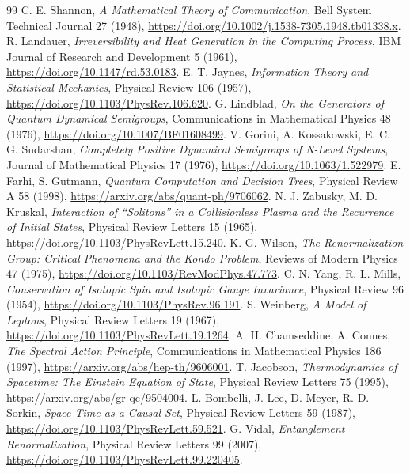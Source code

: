 \documentclass[11pt,a4paper]{article}
\begin{document}
\begin{thebibliography}{99}
 C. E. Shannon, \emph{A Mathematical Theory of Communication}, Bell System Technical Journal 27 (1948), \url{https://doi.org/10.1002/j.1538-7305.1948.tb01338.x}.
 R. Landauer, \emph{Irreversibility and Heat Generation in the Computing Process}, IBM Journal of Research and Development 5 (1961), \url{https://doi.org/10.1147/rd.53.0183}.
 E. T. Jaynes, \emph{Information Theory and Statistical Mechanics}, Physical Review 106 (1957), \url{https://doi.org/10.1103/PhysRev.106.620}.
 G. Lindblad, \emph{On the Generators of Quantum Dynamical Semigroups}, Communications in Mathematical Physics 48 (1976), \url{https://doi.org/10.1007/BF01608499}.
 V. Gorini, A. Kossakowski, E. C. G. Sudarshan, \emph{Completely Positive Dynamical Semigroups of N-Level Systems}, Journal of Mathematical Physics 17 (1976), \url{https://doi.org/10.1063/1.522979}.
 E. Farhi, S. Gutmann, \emph{Quantum Computation and Decision Trees}, Physical Review A 58 (1998), \url{https://arxiv.org/abs/quant-ph/9706062}.
 N. J. Zabusky, M. D. Kruskal, \emph{Interaction of ``Solitons'' in a Collisionless Plasma and the Recurrence of Initial States}, Physical Review Letters 15 (1965), \url{https://doi.org/10.1103/PhysRevLett.15.240}.
 K. G. Wilson, \emph{The Renormalization Group: Critical Phenomena and the Kondo Problem}, Reviews of Modern Physics 47 (1975), \url{https://doi.org/10.1103/RevModPhys.47.773}.
 C. N. Yang, R. L. Mills, \emph{Conservation of Isotopic Spin and Isotopic Gauge Invariance}, Physical Review 96 (1954), \url{https://doi.org/10.1103/PhysRev.96.191}.
 S. Weinberg, \emph{A Model of Leptons}, Physical Review Letters 19 (1967), \url{https://doi.org/10.1103/PhysRevLett.19.1264}.
 A. H. Chamseddine, A. Connes, \emph{The Spectral Action Principle}, Communications in Mathematical Physics 186 (1997), \url{https://arxiv.org/abs/hep-th/9606001}.
 T. Jacobson, \emph{Thermodynamics of Spacetime: The Einstein Equation of State}, Physical Review Letters 75 (1995), \url{https://arxiv.org/abs/gr-qc/9504004}.
 L. Bombelli, J. Lee, D. Meyer, R. D. Sorkin, \emph{Space-Time as a Causal Set}, Physical Review Letters 59 (1987), \url{https://doi.org/10.1103/PhysRevLett.59.521}.
 G. Vidal, \emph{Entanglement Renormalization}, Physical Review Letters 99 (2007), \url{https://doi.org/10.1103/PhysRevLett.99.220405}.

\end{thebibliography}
\end{document}
